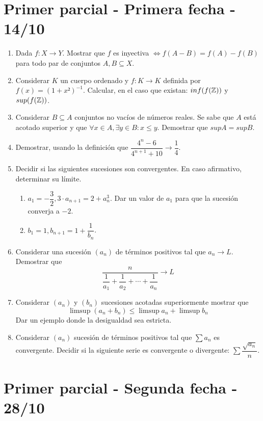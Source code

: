 \section{Primer parcial - Primera fecha - 14/10}

\begin{enumerate}
  \item Dada $f: X \to Y$. Mostrar que $f$ es inyectiva $\iff f(A-B) = f(A) - f(B)$ para todo par de conjuntos $A, B \subseteq X$.
  \item Considerar $K$ un cuerpo ordenado y $f: K \to K$ definida por $f(x) = (1+x²)^{-1}$. Calcular, en el caso que existan: $inf(f(\mathbb{Z}))$ y $sup(f(\mathbb{Z}))$.
  \item Considerar $B \subseteq A$ conjuntos no vacíos de números reales. Se sabe que $A$ está acotado superior y que $\forall x \in A, \exists y \in B : x \leq y$. Demostrar que $sup A = sup B$.
  \item Demostrar, usando la definición que $\dfrac{4^n - 6}{4^{n+1}+10} \to \dfrac{1}{4}$.
  \item Decidir si las siguientes sucesiones son convergentes. En caso afirmativo, determinar su límite. \begin{enumerate}
          \item $a_1 = -\dfrac{3}{2}, 3 \cdot a_{n+1} = 2 + a_n^3$. Dar un valor de $a_1$ para que la sucesión converja a $-2$.
          \item $b_1 = 1, b_{n+1} = 1 + \dfrac{1}{b_n}$.
        \end{enumerate}
  \item Considerar una sucesión $(a_n)$ de términos positivos tal que $a_n \to L$. Demostrar que \begin{equation} \dfrac{n}{\dfrac{1}{a_1} + \dfrac{1}{a_2} + \cdots + \dfrac{1}{a_n}} \to L \end{equation}
  \item Considerar $(a_n)$ y $(b_n)$ sucesiones acotadas superiormente mostrar que \begin{equation} \limsup(a_n + b_n) \leq \limsup a_n + \limsup b_n \end{equation} Dar un ejemplo donde la desigualdad sea estricta.
  \item Considerar $(a_n)$ sucesión de términos positivos tal que $\sum a_n$ es convergente. Decidir si la siguiente serie es convergente o divergente: $\sum \dfrac{\sqrt{a_n}}{n}$.
\end{enumerate}

\section{Primer parcial - Segunda fecha - 28/10}

